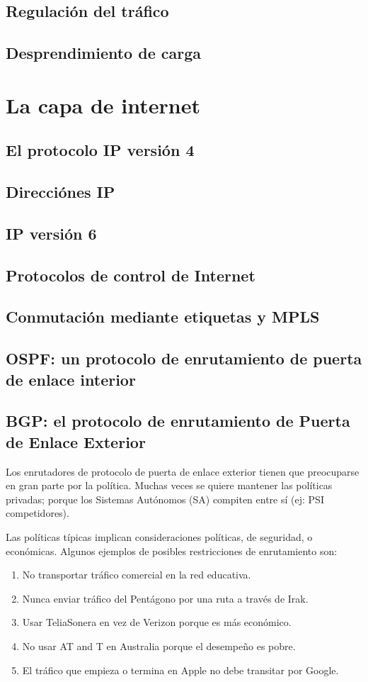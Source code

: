 \documentclass[10pt,a4paper]{report}
\begin{document}
\subsection{Regulación del tráfico}
\subsection{Desprendimiento de carga}

\section{La capa de internet}
\subsection{El protocolo IP versión 4}
\subsection{Direcciónes IP}
\subsection{IP versión 6}
\subsection{Protocolos de control de Internet}
\subsection{Conmutación mediante etiquetas y MPLS}
\subsection{OSPF: un protocolo de enrutamiento de puerta de enlace interior}

\subsection{BGP: el protocolo de enrutamiento de Puerta de Enlace Exterior}
	\par Los enrutadores de protocolo de puerta de enlace exterior tienen que 
	preocuparse en gran parte por la política. Muchas veces se quiere mantener las 
	políticas privadas; porque los Sistemas Autónomos (SA) compiten entre sí (ej: PSI 
	competidores).	
	\par Las políticas típicas implican consideraciones políticas, de seguridad, o 
	económicas. Algunos ejemplos de posibles restricciones de enrutamiento son:
		\begin{enumerate}
			\item  No transportar tráfico comercial en la red educativa.
			\item Nunca enviar tráfico del Pentágono por una ruta a través de Irak.
			\item Usar TeliaSonera en vez de Verizon porque es más económico.
			\item No usar AT and T en Australia porque el desempeño es pobre.
			\item El tráfico que empieza o termina en Apple no debe transitar por Google.
		\end{enumerate}
\end{document}
